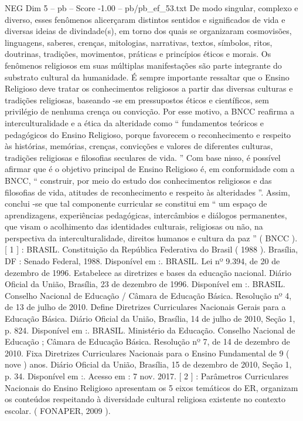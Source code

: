 \begin{textsample}{NEG Dim 5 – pb – Score -1.00 – pb/pb\_ef\_53.txt}
De modo singular, complexo e diverso, esses fenômenos alicerçaram distintos sentidos e significados de vida e diversas ideias de divindade(s), em torno dos quais se organizaram cosmovisões, linguagens, saberes, crenças, mitologias, narrativas, textos, símbolos, ritos, doutrinas, tradições, movimentos, práticas e princípios éticos e morais.
Os fenômenos religiosos em suas múltiplas manifestações são parte integrante do substrato cultural da humanidade.
É sempre importante ressaltar que o Ensino Religioso deve tratar os conhecimentos religiosos a partir das diversas culturas e tradições religiosas, baseando -se em pressupostos éticos e científicos, sem privilégio de nenhuma crença ou convicção.
Por esse motivo, a BNCC reafirma a interculturalidade e a ética da alteridade como “ fundamentos teóricos e pedagógicos do Ensino Religioso, porque favorecem o reconhecimento e respeito às histórias, memórias, crenças, convicções e valores de diferentes culturas, tradições religiosas e filosofias seculares de vida. ” Com base nisso, é possível afirmar que é o objetivo principal de Ensino Religioso é, em conformidade com a BNCC, “ construir, por meio do estudo dos conhecimentos religiosos e das filosofias de vida, atitudes de reconhecimento e respeito às alteridades ”.
Assim, conclui -se que tal componente curricular se constitui em “ um espaço de aprendizagens, experiências pedagógicas, intercâmbios e diálogos permanentes, que visam o acolhimento das identidades culturais, religiosas ou não, na perspectiva da interculturalidade, direitos humanos e cultura da paz ” ( BNCC ). [ 1 ] : BRASIL.
Constituição da República Federativa do Brasil ( 1988 ).
Brasília, DF : Senado Federal, 1988.
Disponível em :.
BRASIL.
Lei nº 9.394, de 20 de dezembro de 1996.
Estabelece as diretrizes e bases da educação nacional.
Diário Oficial da União, Brasília, 23 de dezembro de 1996.
Disponível em :.
BRASIL.
Conselho Nacional de Educação / Câmara de Educação Básica.
Resolução nº 4, de 13 de julho de 2010.
Define Diretrizes Curriculares Nacionais Gerais para a Educação Básica.
Diário Oficial da União, Brasília, 14 de julho de 2010, Seção 1, p. 824.
Disponível em :.
BRASIL.
Ministério da Educação.
Conselho Nacional de Educação ; Câmara de Educação Básica.
Resolução nº 7, de 14 de dezembro de 2010.
Fixa Diretrizes Curriculares Nacionais para o Ensino Fundamental de 9 ( nove ) anos.
Diário Oficial da União, Brasília, 15 de dezembro de 2010, Seção 1, p. 34.
Disponível em :.
Acesso em : 7 nov. 2017. [ 2 ] : Parâmetros Curriculares Nacionais do Ensino Religioso apresentam os 5 eixos temáticos do ER, organizam os conteúdos respeitando à diversidade cultural religiosa existente no contexto escolar. ( FONAPER, 2009 ).

\end{textsample}
